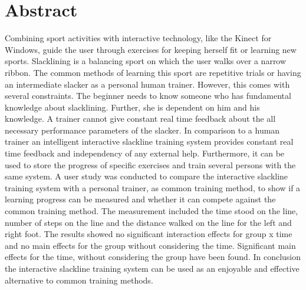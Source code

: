 \section*{Abstract}
\begin{comment}
- Einleitung
- Problem/Ziele
- Vorgesteller lösungsansatz
-- Exergame
-- SLS
-- Real time feedback
- einbau methodischer reihe als lernmethodik
- vergleich zu üblichen personal trainer
- Messung
- Results
- Conclusion

- trend von interaktiven lernmethodiken in allen bereichen des sports
- nichts vergeichbares in slacklinen
- Führen des nutzers mithilfe einer bestimmten lernmethodik und routine
- studie
\end{comment}
Combining sport activities with interactive technology, like the Kinect for Windows, guide the user through exercises for keeping herself fit or learning new sports.
Slacklining is a balancing sport on which the user walks over a narrow ribbon.
The common methods of learning this sport are repetitive trials or having an intermediate slacker as a personal human trainer.
However, this comes with several constraints. 
The beginner needs to know someone who has fundamental knowledge about slacklining.
Further, she is dependent on him and his knowledge.
A trainer cannot give constant real time feedback about the all necessary performance parameters of the slacker.
In comparison to a human trainer an intelligent interactive slackline training system provides constant real time feedback and independency of any external help.
Furthermore, it can be used to store the progress of specific exercises and train several persons with the same system.
A user study was conducted to compare the interactive slackline training system with a personal trainer, as common training method, to show if a learning progress can be measured and whether it can compete against the common training method.
The measurement included the time stood on the line, number of steps on the line and the distance walked on the line for the left and right foot.
The results showed no significant interaction effects for group x time and no main effects for the group without considering the time.
Significant main effects for the time, without considering the group have been found.
In conclusion the interactive slackline training system can be used as an enjoyable and effective alternative to common training methods.

